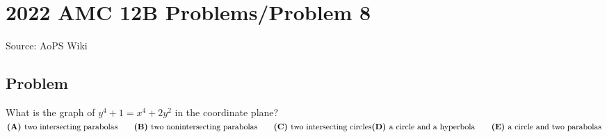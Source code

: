 \documentclass[12pt]{article}
\begin{document}
\section*{{2022 AMC 12B Problems/Problem 8}}
Source: AoPS Wiki

\subsection*{Problem}
What is the graph of $y^4+1=x^4+2y^2$ in the coordinate plane? $\textbf{(A) } \text{two intersecting parabolas} \qquad \textbf{(B) } \text{two nonintersecting parabolas} \qquad \textbf{(C) } \text{two intersecting circles} \qquad \\\\ \textbf{(D) } \text{a circle and a hyperbola} \qquad \textbf{(E) } \text{a circle and two parabolas}$
\end{document}
